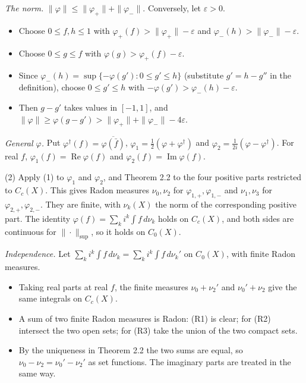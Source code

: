 \documentclass[
  english,
  11pt,
  a4paper,
]{article}
\providecommand{\tightlist}{%
  \setlength{\itemsep}{0pt}\setlength{\parskip}{0pt}}
\begin{document}
\emph{The norm.} \(\|\varphi\|\leq\|\varphi_+\|+\|\varphi_-\|\).
Conversely, let \(\varepsilon>0\).

\begin{itemize}
\tightlist
\item
  Choose \(0\leq f,h\leq1\) with
  \(\varphi_+(f)>\|\varphi_+\|-\varepsilon\) and
  \(\varphi_-(h)>\|\varphi_-\|-\varepsilon\).
\item
  Choose \(0\leq g\leq f\) with \(\varphi(g)>\varphi_+(f)-\varepsilon\).
\item
  Since \(\varphi_-(h)=\sup\{-\varphi(g'):0\leq g'\leq h\}\) (substitute
  \(g'=h-g''\) in the definition), choose \(0\leq g'\leq h\) with
  \(-\varphi(g')>\varphi_-(h)-\varepsilon\).
\item
  Then \(g-g'\) takes values in \([-1,1]\), and
  \(\|\varphi\|\geq\varphi(g-g')>\|\varphi_+\|+\|\varphi_-\|-4\varepsilon\).
\end{itemize}

\emph{General \(\varphi\).} Put
\(\varphi^\dagger(f)=\overline{\varphi(\bar f)}\),
\(\varphi_1=\frac12(\varphi+\varphi^\dagger)\) and
\(\varphi_2=\frac1{2i}(\varphi-\varphi^\dagger)\). For real \(f\),
\(\varphi_1(f)=\operatorname{Re}\varphi(f)\) and
\(\varphi_2(f)=\operatorname{Im}\varphi(f)\).

(2) Apply (1) to \(\varphi_1\) and \(\varphi_2\), and Theorem 2.2 to the
four positive parts restricted to \(C_c(X)\). This gives Radon measures
\(\nu_0,\nu_2\) for \(\varphi_{1,+},\varphi_{1,-}\) and \(\nu_1,\nu_3\)
for \(\varphi_{2,+},\varphi_{2,-}\). They are finite, with \(\nu_k(X)\)
the norm of the corresponding positive part. The identity
\(\varphi(f)=\sum_ki^k\int f\,d\nu_k\) holds on \(C_c(X)\), and both
sides are continuous for \(\|\cdot\|_{\sup}\), so it holds on
\(C_0(X)\).

\emph{Independence.} Let
\(\sum_ki^k\int f\,d\nu_k=\sum_ki^k\int f\,d\nu_k'\) on \(C_0(X)\), with
finite Radon measures.

\begin{itemize}
\tightlist
\item
  Taking real parts at real \(f\), the finite measures \(\nu_0+\nu_2'\)
  and \(\nu_0'+\nu_2\) give the same integrals on \(C_c(X)\).
\item
  A sum of two finite Radon measures is Radon: (R1) is clear; for (R2)
  intersect the two open sets; for (R3) take the union of the two
  compact sets.
\item
  By the uniqueness in Theorem 2.2 the two sums are equal, so
  \(\nu_0-\nu_2=\nu_0'-\nu_2'\) as set functions. The imaginary parts
  are treated in the same way.
\end{itemize}
\end{document}
